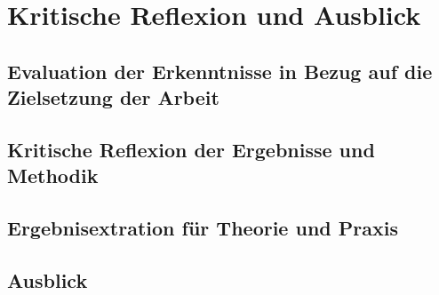 \chapter{Kritische Reflexion und Ausblick}
\section{Evaluation der Erkenntnisse in Bezug auf die Zielsetzung der Arbeit }
\section{Kritische Reflexion der Ergebnisse und Methodik}
\section{Ergebnisextration für Theorie und Praxis}
\section{Ausblick}